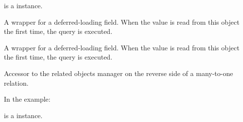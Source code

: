 \documentclass[letterpaper,10pt,english]{sphinxmanual}
\begin{document}
\begin{fulllineitems}
\begin{fulllineitems}
 is a  instance.

\end{fulllineitems}


\begin{fulllineitems}
\label{\detokenize{QuChemPedIA.models:QuChemPedIA.models.VersionModel.SoftwareVersion.id_software_id}}
A wrapper for a deferred-loading field. When the value is read from this
object the first time, the query is executed.

\end{fulllineitems}


\begin{fulllineitems}
\label{\detokenize{QuChemPedIA.models:QuChemPedIA.models.VersionModel.SoftwareVersion.id_version}}
A wrapper for a deferred-loading field. When the value is read from this
object the first time, the query is executed.

\end{fulllineitems}


\begin{fulllineitems}
\label{\detokenize{QuChemPedIA.models:QuChemPedIA.models.VersionModel.SoftwareVersion.importfile_set}}
Accessor to the related objects manager on the reverse side of a
many-to-one relation.

In the example:

%
\begin{sphinxVerbatim}[commandchars=\\\{\}]
 
       
\end{sphinxVerbatim}

 is a  instance.


\end{fulllineitems}
\end{fulllineitems}
\end{document}

